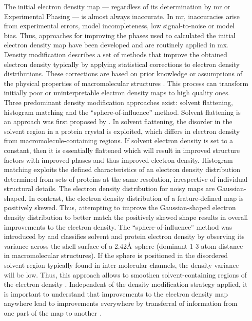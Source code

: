 The initial electron density map --- regardless of its determination by \gls{mr} or Experimental Phasing --- is almost always inaccurate. In \gls{mr}, inaccuracies arise from experimental errors, model incompleteness, low signal-to-noise or model bias. Thus, approaches for improving the phases used to calculated the initial electron density map have been developed and are routinely applied in \gls{mx}. Density modification describes a set of methods that improve the obtained electron density typically by applying statistical corrections to electron density distributions. These corrections are based on prior knowledge or assumptions of the physical properties of macromolecular structures \cite{Rupp2010-nc}. This process can transform initially poor or uninterpretable electron density maps to high quality ones. Three predominant density modification approaches exist: solvent flattening, histogram matching and the ``sphere-of-influence'' method. Solvent flattening is an approach was first proposed by \textcite{Wang1985-zu}. In solvent flattening, the disorder in the solvent region in a protein crystal is exploited, which differs in electron density from macromolecule-containing regions. If solvent electron density is set to a constant, then it is essentially flattened which will result in improved structure factors with improved phases and thus improved electron density. Histogram matching \cite{Lunin1988-lx} exploits the defined characteristics of an electron density distribution determined from sets of proteins at the same resolution, irrespective of individual structural details. The electron density distribution for noisy maps are Gaussian-shaped. In contrast, the electron density distribution of a feature-defined map is positively skewed. Thus, attempting to improve the Gaussian-shaped electron density distribution to better match the positively skewed shape results in overall improvements to the electron density. The ``sphere-of-influence'' method was introduced by \textcite{Sheldrick2002-tx} and classifies solvent and protein electron density by observing its variance across the shell surface of a 2.42\AA\ sphere (dominant 1-3 atom distance in macromolecular structures). If the sphere is positioned in the disordered solvent region typically found in inter-molecular channels, the density variance will be low. Thus, this approach allows to smoothen solvent-containing regions of the electron density \cite{Sheldrick2002-tx}. Independent of the density modification strategy applied, it is important to understand that improvements to the electron density map anywhere lead to improvements everywhere by transferral of information from one part of the map to another \cite{Terwilliger2000-sz}.


